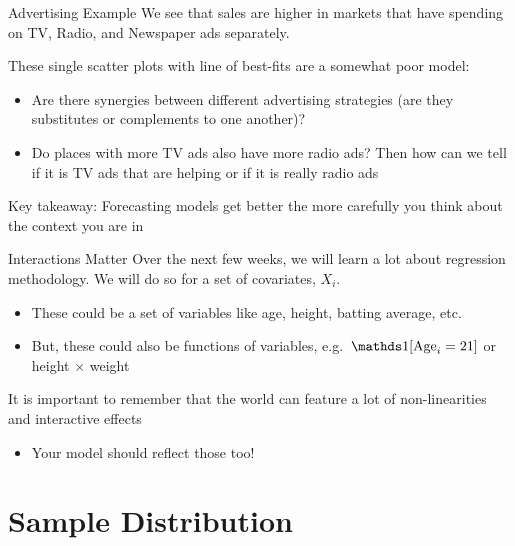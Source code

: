 \documentclass[aspectratio=169,t,11pt,table]{beamer}
\begin{document}
\begin{frame}{Advertising Example}
  We see that sales are higher in markets that have spending on TV, Radio, and Newspaper ads separately. 
  
  \pause
  \bigskip 
  These single scatter plots with line of best-fits are a somewhat poor model:
  \begin{itemize}
    \item Are there synergies between different advertising strategies (are they substitutes or complements to one another)?

    \item Do places with more TV ads also have more radio ads? Then how can we tell if it is TV ads that are helping or if it is really radio ads 
  \end{itemize}

  \pause\bigskip
  \alert{Key takeaway:} Forecasting models get better the more carefully you think about the context you are in
\end{frame}

\begin{frame}{Interactions Matter}
  Over the next few weeks, we will learn a lot about regression methodology. We will do so for a set of covariates, $X_i$. 
  \begin{itemize}
    \item These could be a set of variables like age, height, batting average, etc.
    \item But, these could also be functions of variables, e.g. $\one{\text{Age}_i = 21}$ or height $\times$ weight
  \end{itemize}

  \bigskip
  It is important to remember that the world can feature a lot of non-linearities and interactive effects
  \begin{itemize}
    \item Your model should reflect those too! 
  \end{itemize}
\end{frame}


\section{Sample Distribution}
\end{document}
